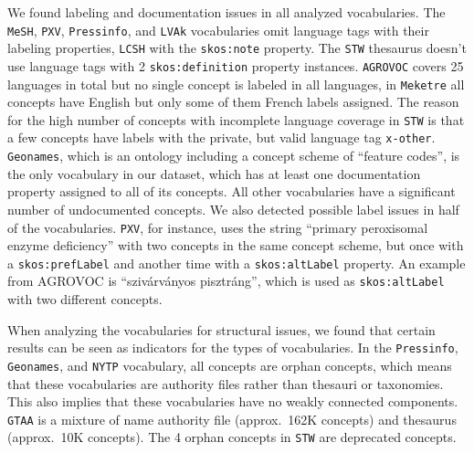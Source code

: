 We found labeling and documentation issues in all analyzed vocabularies.
The \texttt{MeSH}, \texttt{PXV}, \texttt{Pressinfo}, and \texttt{LVAk} vocabularies omit language tags with their labeling properties, \texttt{LCSH} with the \texttt{skos:note} property. The \texttt{STW} thesaurus doesn't use language tags with 2 \texttt{skos:definition} property instances.
\texttt{AGROVOC} covers 25 languages in total but no single concept is labeled in all languages, in \texttt{Meketre} all concepts have English but only some of them French labels assigned. The reason for the high number of concepts with incomplete language coverage in \texttt{STW} is that a few concepts have labels with the private, but valid language tag \texttt{x-other}. 
\texttt{Geonames}, which is an ontology including a concept scheme of ``feature codes'', is the only vocabulary in our dataset, which has at least one documentation property assigned to all of its concepts. All other vocabularies have a significant number of undocumented concepts.
We also detected possible label issues in half of the vocabularies. \texttt{PXV}, for instance, uses the string ``primary peroxisomal enzyme deficiency'' with two concepts in the same concept scheme, but once with a \texttt{skos:prefLabel} and another time with a \texttt{skos:altLabel} property. An example from AGROVOC is ``sziv\'{a}rv\'{a}nyos pisztr\'{a}ng'', which is used as \texttt{skos:altLabel} with two different concepts.


When analyzing the vocabularies for structural issues, we found that certain results can be seen as indicators for the types of vocabularies.
In the \texttt{Pressinfo}, \texttt{Geonames}, and \texttt{NYTP} vocabulary, all concepts are orphan concepts, which means that these vocabularies are authority files rather than thesauri or taxonomies. This also implies that these vocabularies have no weakly connected components. \texttt{GTAA} is a mixture of name authority file (approx.~162K concepts) and thesaurus (approx.~10K concepts). The 4 orphan concepts in \texttt{STW} are deprecated concepts.


